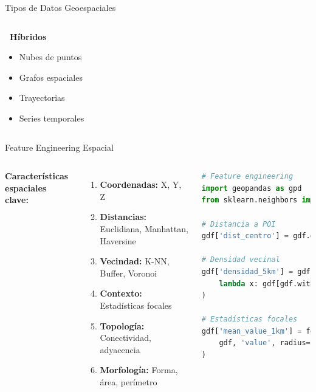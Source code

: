 \documentclass[10pt,aspectratio=169]{beamer}
\begin{document}
\begin{frame}{Tipos de Datos Geoespaciales}
\begin{columns}
        \begin{center}
            \textbf{\faDatabase\ Híbridos}\\
            \vspace{2mm}
            \begin{itemize}
                \item Nubes de puntos
                \item Grafos espaciales
                \item Trayectorias
                \item Series temporales
            \end{itemize}
        \end{center}
    \end{columns}
\end{frame}

\begin{frame}{Feature Engineering Espacial}
    \begin{columns}
        \textbf{Características espaciales clave:}
        \begin{enumerate}
            \item \textbf{Coordenadas:} X, Y, Z
            \item \textbf{Distancias:} Euclidiana, Manhattan, Haversine
            \item \textbf{Vecindad:} K-NN, Buffer, Voronoi
            \item \textbf{Contexto:} Estadísticas focales
            \item \textbf{Topología:} Conectividad, adyacencia
            \item \textbf{Morfología:} Forma, área, perímetro
        \end{enumerate}

        \begin{lstlisting}[language=Python,basicstyle=\tiny]
# Feature engineering
import geopandas as gpd
from sklearn.neighbors import KNeighborsRegressor

# Distancia a POI
gdf['dist_centro'] = gdf.geometry.distance(centro)

# Densidad vecinal
gdf['densidad_5km'] = gdf.buffer(5000).apply(
    lambda x: gdf[gdf.within(x)].shape[0]
)

# Estadísticas focales
gdf['mean_value_1km'] = focal_statistics(
    gdf, 'value', radius=1000, stat='mean'
)
        \end{lstlisting}
    \end{columns}
\end{frame}
\end{document}
